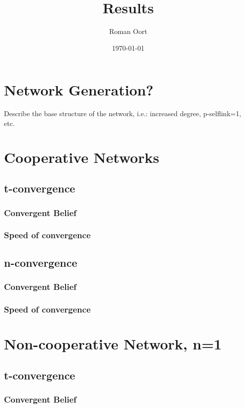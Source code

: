 \documentclass{article}
\title{Results}
\author{Roman Oort}
\date{\today}
\begin{document}
\maketitle

\tableofcontents
\newpage
\section{Network Generation?}

Describe the base structure of the network, i.e.: increased degree, p-selflink=1, etc.

\section{Cooperative Networks}
\subsection{t-convergence}
\subsubsection{Convergent Belief}
\subsubsection{Speed of convergence}
\subsection{n-convergence}
\subsubsection{Convergent Belief}
\subsubsection{Speed of convergence}

\section{Non-cooperative Network, n=1}
\subsection{t-convergence}
\subsubsection{Convergent Belief}
\end{document}
